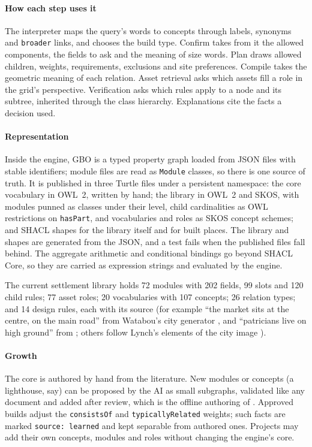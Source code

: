 \documentclass[conference]{IEEEtran}
\begin{document}
\paragraph{How each step uses it} The interpreter maps the query's words to concepts
through labels, synonyms and \texttt{broader} links, and chooses the build type. Confirm
takes from it the allowed components, the fields to ask and the meaning of size words.
Plan draws allowed children, weights, requirements, exclusions and site preferences.
Compile takes the geometric meaning of each relation. Asset retrieval asks which assets
fill a role in the grid's perspective. Verification asks which rules apply to a node and
its subtree, inherited through the class hierarchy. Explanations cite the facts a
decision used.

\paragraph{Representation} Inside the engine, GBO is a typed property graph loaded from
JSON files with stable identifiers; module files are read as \texttt{Module} classes, so
there is one source of truth. It is published in three Turtle files under a persistent
namespace: the core vocabulary in OWL~2, written by hand; the library in OWL~2 and SKOS,
with modules punned as classes under their level, child cardinalities as OWL
restrictions on \texttt{hasPart}, and vocabularies and roles as SKOS concept schemes; and
SHACL shapes for the library itself and for built places. The library and shapes are
generated from the JSON, and a test fails when the published files fall behind. The
aggregate arithmetic and conditional bindings go beyond SHACL Core, so they are carried
as expression strings and evaluated by the engine.

The current settlement library holds 72 modules with 202 fields, 99 slots and 120 child
rules; 77 asset roles; 20 vocabularies with 107 concepts; 26 relation types; and 14
design rules, each with its source (for example ``the market sits at the centre, on the
main road'' from Watabou's city generator \cite{watabou}, and ``patricians live on high
ground'' from \cite{emilien2012}; others follow Lynch's elements of the city image
\cite{lynch1960}).

\paragraph{Growth} The core is authored by hand from the literature. New modules or
concepts (a lighthouse, say) can be proposed by the AI as small subgraphs, validated like
any document and added after review, which is the offline authoring of
\cite{xu2025database}. Approved builds adjust the \texttt{consistsOf} and
\texttt{typicallyRelated} weights; such facts are marked \texttt{source: learned} and kept
separable from authored ones. Projects may add their own concepts, modules and roles
without changing the engine's core.
\end{document}
